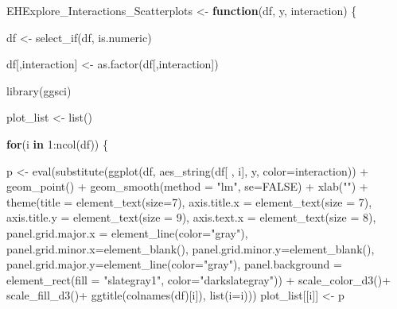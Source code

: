 \documentclass[
]{article}
\newenvironment{Shaded}{\begin{snugshade}}{\end{snugshade}}
\newcommand{\AttributeTok}[1]{\textcolor[rgb]{0.77,0.63,0.00}{#1}}
\newcommand{\ConstantTok}[1]{\textcolor[rgb]{0.00,0.00,0.00}{#1}}
\newcommand{\ControlFlowTok}[1]{\textcolor[rgb]{0.13,0.29,0.53}{\textbf{#1}}}
\newcommand{\DecValTok}[1]{\textcolor[rgb]{0.00,0.00,0.81}{#1}}
\newcommand{\FunctionTok}[1]{\textcolor[rgb]{0.00,0.00,0.00}{#1}}
\newcommand{\NormalTok}[1]{#1}
\newcommand{\OtherTok}[1]{\textcolor[rgb]{0.56,0.35,0.01}{#1}}
\newcommand{\SpecialCharTok}[1]{\textcolor[rgb]{0.00,0.00,0.00}{#1}}
\newcommand{\StringTok}[1]{\textcolor[rgb]{0.31,0.60,0.02}{#1}}
\begin{document}
\begin{Shaded}
\begin{Highlighting}[]
\NormalTok{EHExplore\_Interactions\_Scatterplots }\OtherTok{\textless{}{-}} \ControlFlowTok{function}\NormalTok{(df, y, interaction) \{}

\NormalTok{df }\OtherTok{\textless{}{-}} \FunctionTok{select\_if}\NormalTok{(df, is.numeric)}
  
\NormalTok{df[,interaction] }\OtherTok{\textless{}{-}} \FunctionTok{as.factor}\NormalTok{(df[,interaction])}
  
\FunctionTok{library}\NormalTok{(ggsci)}
  
\NormalTok{plot\_list }\OtherTok{\textless{}{-}} \FunctionTok{list}\NormalTok{()}

\ControlFlowTok{for}\NormalTok{(i }\ControlFlowTok{in} \DecValTok{1}\SpecialCharTok{:}\FunctionTok{ncol}\NormalTok{(df)) \{     }
   
\NormalTok{  p }\OtherTok{\textless{}{-}} \FunctionTok{eval}\NormalTok{(}\FunctionTok{substitute}\NormalTok{(}\FunctionTok{ggplot}\NormalTok{(df, }\FunctionTok{aes\_string}\NormalTok{(df[ , i], y, }\AttributeTok{color=}\NormalTok{interaction)) }\SpecialCharTok{+}
  \FunctionTok{geom\_point}\NormalTok{() }\SpecialCharTok{+}
  \FunctionTok{geom\_smooth}\NormalTok{(}\AttributeTok{method =} \StringTok{"lm"}\NormalTok{, }\AttributeTok{se=}\ConstantTok{FALSE}\NormalTok{) }\SpecialCharTok{+}
    \FunctionTok{xlab}\NormalTok{(}\StringTok{""}\NormalTok{) }\SpecialCharTok{+}
    \FunctionTok{theme}\NormalTok{(}\AttributeTok{title =} \FunctionTok{element\_text}\NormalTok{(}\AttributeTok{size=}\DecValTok{7}\NormalTok{), }\AttributeTok{axis.title.x =} \FunctionTok{element\_text}\NormalTok{(}\AttributeTok{size =} \DecValTok{7}\NormalTok{), }\AttributeTok{axis.title.y =} \FunctionTok{element\_text}\NormalTok{(}\AttributeTok{size =} \DecValTok{9}\NormalTok{), }\AttributeTok{axis.text.x =} \FunctionTok{element\_text}\NormalTok{(}\AttributeTok{size =} \DecValTok{8}\NormalTok{), }\AttributeTok{panel.grid.major.x =} \FunctionTok{element\_line}\NormalTok{(}\AttributeTok{color=}\StringTok{"gray"}\NormalTok{), }\AttributeTok{panel.grid.minor.x=}\FunctionTok{element\_blank}\NormalTok{(), }\AttributeTok{panel.grid.minor.y=}\FunctionTok{element\_blank}\NormalTok{(), }\AttributeTok{panel.grid.major.y=}\FunctionTok{element\_line}\NormalTok{(}\AttributeTok{color=}\StringTok{"gray"}\NormalTok{), }\AttributeTok{panel.background =} \FunctionTok{element\_rect}\NormalTok{(}\AttributeTok{fill =} \StringTok{"slategray1"}\NormalTok{, }\AttributeTok{color=}\StringTok{"darkslategray"}\NormalTok{)) }\SpecialCharTok{+}
  \FunctionTok{scale\_color\_d3}\NormalTok{()}\SpecialCharTok{+}
  \FunctionTok{scale\_fill\_d3}\NormalTok{()}\SpecialCharTok{+}
  \FunctionTok{ggtitle}\NormalTok{(}\FunctionTok{colnames}\NormalTok{(df)[i]), }\FunctionTok{list}\NormalTok{(}\AttributeTok{i=}\NormalTok{i)))}
\NormalTok{  plot\_list[[i]] }\OtherTok{\textless{}{-}}\NormalTok{ p }
  

\end{Highlighting}
\end{Shaded}
\end{document}
